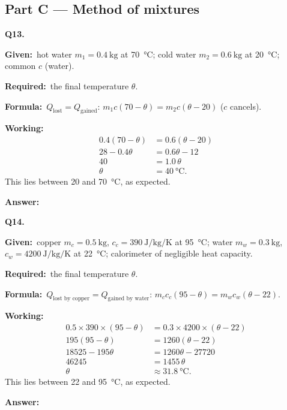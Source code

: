 \documentclass[10pt]{article}
\newcommand{\Given}{\par\vspace{2pt}\textbf{Given:}\ }
\newcommand{\Required}{\par\vspace{2pt}\textbf{Required:}\ }
\newcommand{\Formula}{\par\vspace{2pt}\textbf{Formula:}\ }
\newcommand{\Working}{\par\vspace{2pt}\textbf{Working:}}
\newcommand{\Answer}[1]{\par\vspace{2pt}\textbf{Answer:}\ \fbox{#1}}
\begin{document}
\subsection*{Part C --- Method of mixtures}

\textbf{Q13.}
\Given hot water $m_1=\SI{0.4}{\kilogram}$ at \SI{70}{\degreeCelsius};
cold water $m_2=\SI{0.6}{\kilogram}$ at \SI{20}{\degreeCelsius};
common $c$ (water).
\Required the final temperature $\theta$.
\Formula $Q_{\text{lost}}=Q_{\text{gained}}$:
$m_1 c(70-\theta)=m_2 c(\theta-20)$ ($c$ cancels).
\Working
\begin{align*}
  0.4(70-\theta) &= 0.6(\theta-20)\\
  28 - 0.4\theta &= 0.6\theta - 12\\
  40 &= 1.0\,\theta\\
  \theta &= \SI{40}{\degreeCelsius}.
\end{align*}
This lies between \SI{20}{} and \SI{70}{\degreeCelsius}, as expected.
\Answer{$\theta = \SI{40}{\degreeCelsius}$}

\textbf{Q14.}
\Given copper $m_c=\SI{0.5}{\kilogram}$, $c_c=\SI{390}{\joule\per\kilogram\per\kelvin}$
at \SI{95}{\degreeCelsius}; water $m_w=\SI{0.3}{\kilogram}$,
$c_w=\SI{4200}{\joule\per\kilogram\per\kelvin}$ at \SI{22}{\degreeCelsius};
calorimeter of negligible heat capacity.
\Required the final temperature $\theta$.
\Formula $Q_{\text{lost by copper}}=Q_{\text{gained by water}}$:
$m_c c_c(95-\theta)=m_w c_w(\theta-22)$.
\Working
\begin{align*}
  0.5 \times 390 \times (95-\theta) &= 0.3 \times 4200 \times (\theta-22)\\
  195(95-\theta) &= 1260(\theta-22)\\
  18525 - 195\theta &= 1260\theta - 27720\\
  46245 &= 1455\,\theta\\
  \theta &\approx \SI{31.8}{\degreeCelsius}.
\end{align*}
This lies between \SI{22}{} and \SI{95}{\degreeCelsius}, as expected.
\Answer{$\theta \approx \SI{31.8}{\degreeCelsius}$}
\end{document}
